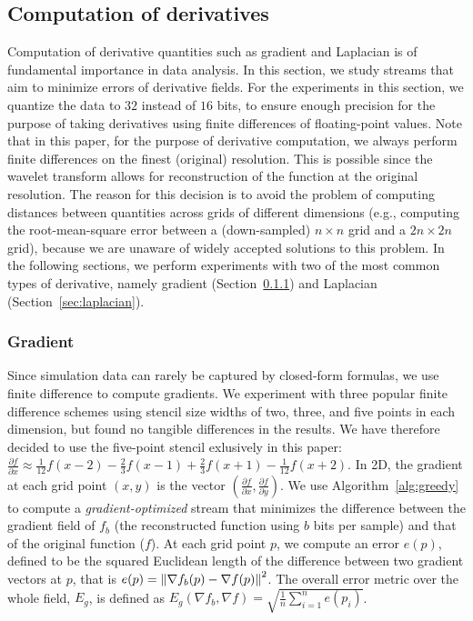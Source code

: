 \subsection{Computation of derivatives}
\label{sec:derivatives}

Computation of derivative quantities such as gradient and Laplacian is of fundamental importance in
data analysis. In this section, we study streams that aim to minimize errors of derivative fields.
For the experiments in this section, we quantize the data to $32$ instead of $16$ bits, to ensure
enough precision for the purpose of taking derivatives using finite differences of floating-point
values. Note that in this paper, for the purpose of derivative computation, we always perform finite
differences on the finest (original) resolution. This is possible since the wavelet transform allows
for reconstruction of the function at the original resolution. The reason for this decision is to
avoid the problem of computing distances between quantities across grids of different dimensions
(e.g., computing the root-mean-square error between a (down-sampled) $n\times n$ grid and a
$2n\times 2n$ grid), because we are unaware of widely accepted solutions to this problem. In the
following sections, we perform experiments with two of the most common types of derivative, namely
gradient (Section~\ref{sec:gradient}) and Laplacian (Section~\ref{sec:laplacian}).

\subsubsection{Gradient}
\label{sec:gradient}

Since simulation data can rarely be captured by closed-form formulas, we use finite difference to
compute gradients. We experiment with three popular finite difference schemes using stencil size
widths of two, three, and five points in each dimension, but found no tangible differences in the
results. We have therefore decided to use the five-point stencil exlusively in this paper:
$\frac{\partial f}{\partial x}\approx
\frac{1}{12}f(x-2)-\frac{2}{3}f(x-1)+\frac{2}{3}f(x+1)-\frac{1}{12}f(x+2)$. In 2D, the gradient at
each grid point $(x,y)$ is the vector $(\frac{\partial f}{\partial x},\frac{\partial f}{\partial
y})$. We use Algorithm~\ref{alg:greedy} to compute a \emph{gradient-optimized} stream that minimizes
the difference between the gradient field of $f_b$ (the reconstructed function using $b$ bits per
sample) and that of the original function ($f$). At each grid point $p$, we compute an error $e(p)$,
defined to be the squared Euclidean length of the difference between two gradient vectors at $p$,
that is $e(p)=\left\lVert\nabla f_b(p)-\nabla f(p)\right\rVert^2$. The overall error metric over the whole field,
$E_g$, is defined as $E_g(\nabla f_b,\nabla f)=\sqrt{\frac{1}{n}\sum_{i=1}^{n}{e(p_i)}}$.

